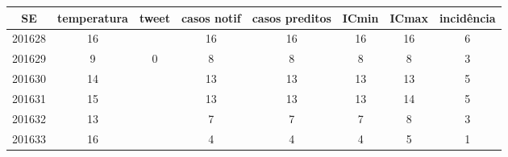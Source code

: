 \begin{tabular}{c|ccccccc}
  \hline
SE & temperatura & tweet & casos notif & casos preditos & ICmin & ICmax & incidência \\ 
  \hline
201628 & 16 &  & 16 & 16 & 16 & 16 & 6 \\ 
  201629 & 9 & 0 & 8 & 8 & 8 & 8 & 3 \\ 
  201630 & 14 &  & 13 & 13 & 13 & 13 & 5 \\ 
  201631 & 15 &  & 13 & 13 & 13 & 14 & 5 \\ 
  201632 & 13 &  & 7 & 7 & 7 & 8 & 3 \\ 
  201633 & 16 &  & 4 & 4 & 4 & 5 & 1 \\ 
   \hline
\end{tabular}
